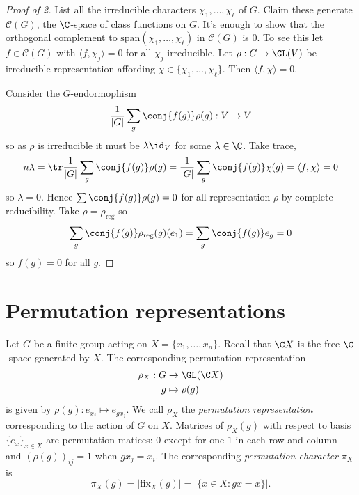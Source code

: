 \documentclass[a4paper]{article}
\begin{document}
\begin{proof}[Proof of  2]
  List all the irreducible characters \(\chi_1, \dots, \chi_\ell\) of \(G\). Claim these generate \(\mathcal C(G)\), the \(\C\)-space of class functions on \(G\). It's enough to show that the orthogonal complement to \(\text{span} (\chi_1, \dots, \chi_\ell)\) in \(\mathcal C(G)\) is \(0\). To see this let \(f \in \mathcal C(G)\) with \(\langle f, \chi_j \rangle = 0\) for all \(\chi_j\) irreducible. Let \(\rho: G \to \GL(V)\) be irreducible representation affording \(\chi \in \{\chi_1, \dots, \chi_\ell\}\). Then \(\langle f, \chi \rangle = 0\).

  Consider the \(G\)-endormophism
  \[
    \frac{1}{|G|} \sum_g \conj{f(g)} \rho(g): V \to V
  \]
  so as \(\rho\) is irreducible it must be \(\lambda \id_V\) for some \(\lambda \in \C\). Take trace,
  \[
    n \lambda
    = \tr \frac{1}{|G|} \sum_g \conj{f(g)} \rho(g)
    = \frac{1}{|G|} \sum_g \conj{f(g)} \chi(g)
    = \langle f, \chi \rangle
    = 0
  \]
  so \(\lambda = 0\). Hence \(\sum \conj{f(g)} \rho(g) = 0\) for all representation \(\rho\) by complete reducibility. Take \(\rho = \rho_{\text{reg}}\) so
  \[
    \sum_g \conj{f(g)} \rho_{\text{reg}}(g)(e_1) = \sum_g \conj{f(g)} e_g = 0
  \]
  so \(f(g) = 0\) for all \(g\).
\end{proof}

\section{Permutation representations}

Let \(G\) be a finite group acting on \(X = \{x_1, \dots, x_n\}\). Recall that \(\C X\) is the free \(\C\)-space generated by \(X\). The corresponding permutation representation
\begin{align*}
  \rho_X: G &\to \GL(\C X) \\
  g &\mapsto \rho(g)
\end{align*}
is given by \(\rho(g): e_{x_j} \mapsto e_{gx_j}\). We call \(\rho_X\) the \emph{permutation representation} corresponding to the action of \(G\) on \(X\). Matrices of \(\rho_X(g)\) with respect to basis \(\{e_x\}_{x \in X}\) are permutation matices: \(0\) except for one \(1\) in each row and column and \((\rho(g))_{ij} = 1\) when \(gx_j = x_i\). The corresponding \emph{permutation character} \(\pi_X\) is
\[
  \pi_X(g) = |\text{fix}_X(g)| = |\{x \in X: gx = x\}|.
\]
\end{document}
